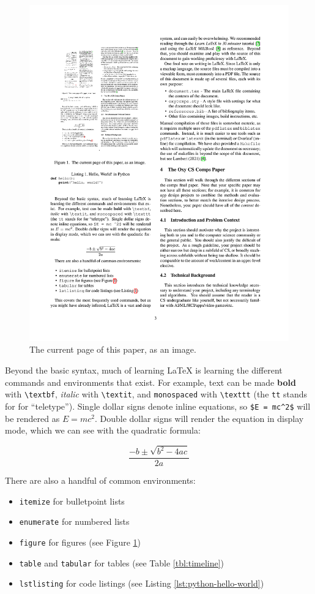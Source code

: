 \documentclass[10pt,twocolumn]{article}
\begin{document}
\begin{figure}
    \centering
    \includegraphics[width=.95\linewidth]{recursion.png}
    \caption{
        The current page of this paper, as an image.
    }
    \label{fig:first-page}
\end{figure}

Beyond the basic syntax, much of learning LaTeX is learning the different commands and environments that exist.
For example, text can be made \textbf{bold} with \texttt{\textbackslash textbf}, \textit{italic} with \texttt{\textbackslash textit}, and \texttt{monospaced} with \texttt{\textbackslash texttt} (the \texttt{tt} stands for for ``teletype'').
Single dollar signs denote inline equations, so \texttt{\$E = mc\textasciicircum 2\$} will be rendered as $E = mc^2$.
Double dollar signs will render the equation in display mode, which we can see with the quadratic formula:

$$\frac{{-b \pm \sqrt {b^2 - 4ac} }}{{2a}}$$

There are also a handful of common environments:

\begin{itemize}
    \item \texttt{itemize} for bulletpoint lists
    \item \texttt{enumerate} for numbered lists
    \item \texttt{figure} for figures (see Figure \ref{fig:first-page})
    \item \texttt{table} and \texttt{tabular} for tables (see Table \ref{tbl:timeline})
    \item \texttt{lstlisting} for code listings (see Listing \ref{lst:python-hello-world})
\end{itemize}
\end{document}
